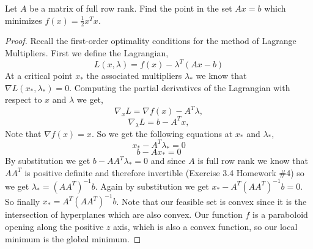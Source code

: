 \documentclass[12pt]{article}
\makeatletter
\theoremstyle{homework}
\newenvironment{exercise}[1]
{\def\@currentlabel{#1}\exercisecore}
{\endexercisecore}
\makeatother
\begin{document}
\begin{exercise}{2.7} Let $A$ be a matrix of full row rank. Find the point in the set $Ax = b$ which minimizes 
  $f(x) = \frac{1}{2}x^Tx$.
  \begin{proof} Recall the first-order optimality conditions for the method of Lagrange Multipliers. First we define the Lagrangian, 
    \begin{equation*}
      L(x, \lambda) = f(x) - \lambda^T(Ax - b)
    \end{equation*}
    At a critical point $x_*$ the associated multipliers $\lambda_*$ we know that $\nabla L(x_*, \lambda_*) = 0$.
    Computing the partial derivatives of the Lagrangian with respect to $x$ and $\lambda$ we get, 
    \begin{equation*}
      \nabla_x L = \nabla f(x) - A^T\lambda,
    \end{equation*}
    \begin{equation*}
      \nabla_\lambda L = b - A^Tx,
    \end{equation*}
    Note that $\nabla f(x) = x$.
    So we get the following equations at $x_*$ and $\lambda_*$, 
    \begin{equation*}
      x_* - A^T\lambda_* = 0
    \end{equation*}
    \begin{equation*}
      b - Ax_* = 0
    \end{equation*}
    By substitution we get $b - AA^T\lambda_* = 0$ and since $A$ is full row rank we know that $AA^T$ is positive definite and therefore invertible (Exercise 3.4 Homework \#4) so we get $\lambda_* = (AA^T)^{-1}b$. Again by substitution we get  $x_* - A^T(AA^T)^{-1}b = 0$. So finally
    $x_* = A^T(AA^T)^{-1}b$. Note that our feasible set is convex since it is the intersection of hyperplanes which are also convex. Our 
    function $f$ is a paraboloid opening along the positive $z$ axis, which is also a convex function, so our local minimum 
    is the global minimum. 
    \end{proof}
\end{exercise}
\vspace{.5in}
\end{document}
